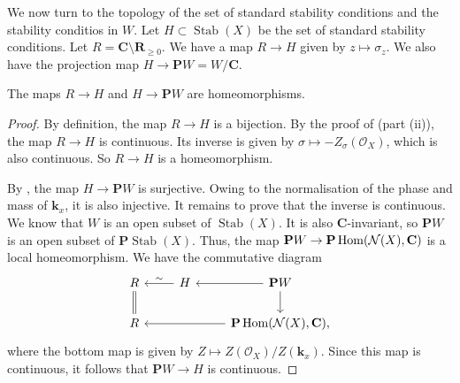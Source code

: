\documentclass{amsart}
\begin{document}
We now turn to the topology of the set of standard stability conditions and the stability conditios in \(W\).
Let \(H \subset \operatorname{Stab}(X)\) be the set of standard stability conditions.
Let \(R = \mathbf{C} \setminus \mathbf{R}_{\geq 0}\).
We have a map \(R \to H\) given by \(z \mapsto \sigma_z\).
We also have the projection map \(H \to \mathbf{P}W = W/ \mathbf{C}\).
\begin{proposition}\label{prop:chart}
 The maps \(R \to H\) and \(H \to \mathbf{P} W\) are homeomorphisms.
\end{proposition}
\begin{proof}
  By definition, the map \(R \to H\) is a bijection.
  By the proof of \cite[Theorem~4.8]{huy.mac.ste:08} (part (ii)), the map \(R \to H\) is continuous.
  Its inverse is given by \(\sigma \mapsto -Z_{\sigma}(\mathcal{O}_{X})\), which is also continuous.
  So \(R \to H\) is a homeomorphism.

  By , the map \(H \to \mathbf{P} W\) is surjective.
  Owing to the normalisation of the phase and mass of \(\mathbf{k}_x\), it is also injective.
  It remains to prove that the inverse is continuous.
  We know that \(W\) is an open subset of \(\operatorname{Stab}(X)\).
  It is also \(\mathbf{C}\)-invariant, so \(\mathbf{P} W\) is an open subset of \(\mathbf{P} \operatorname{Stab}(X)\).
  Thus, the map \(\mathbf{P} W \to \mathbf{P} \operatorname{Hom}(\mathcal{N}(X), \mathbf{C})\) is a local homeomorphism.
  We have the commutative diagram
  \[
    \begin{tikzcd}
      R\ar[equal]{d} & H \ar{l}[above]{\sim} & \mathbf{P} W\ar{l}\ar{d} \\
      R & & \mathbf{P} \Hom(\mathcal{N}(X), \mathbf{C})\ar{ll},
    \end{tikzcd}
  \]
  where the bottom map is given by \(Z \mapsto  Z(\mathcal{O}_X)/Z(\mathbf{k}_x)\).
  Since this map is continuous, it follows that \(\mathbf{P} W \to H\) is continuous.
\end{proof}
\end{document}
